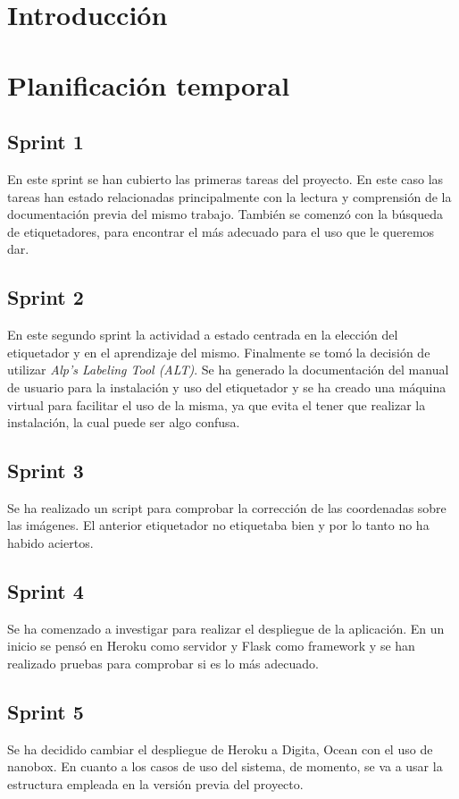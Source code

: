 
\section{Introducción}


\section{Planificación temporal}
\subsection{Sprint 1}
En este sprint se han cubierto las primeras tareas del proyecto. En este caso las tareas han estado relacionadas principalmente con la lectura y comprensión de la documentación previa del mismo trabajo.
También se comenzó con la búsqueda de etiquetadores, para encontrar el más adecuado para el uso que le queremos dar.
\subsection{Sprint 2}
En este segundo sprint la actividad a estado centrada en la elección del etiquetador y en el aprendizaje del mismo. Finalmente se tomó la decisión de utilizar \textit{Alp’s Labeling Tool (ALT)}. 
Se ha generado la documentación del manual de usuario para la instalación y uso del etiquetador y se ha creado una máquina virtual para facilitar el uso de la misma, ya que evita el tener que realizar la instalación, la cual puede ser algo confusa.
\subsection{Sprint 3}
Se ha realizado un script para comprobar la corrección de las coordenadas sobre las imágenes. El anterior etiquetador no etiquetaba bien y por lo tanto no ha habido aciertos.
\subsection{Sprint 4}
Se ha comenzado a investigar para realizar el despliegue de la aplicación. En un inicio se pensó en Heroku como servidor y Flask como framework y se han realizado pruebas para comprobar si es lo más adecuado. 
\subsection{Sprint 5}
Se ha decidido cambiar el despliegue de Heroku a Digita, Ocean con el uso de nanobox. En cuanto a los casos de uso del sistema, de momento, se va a usar la estructura empleada en la versión previa del proyecto.
